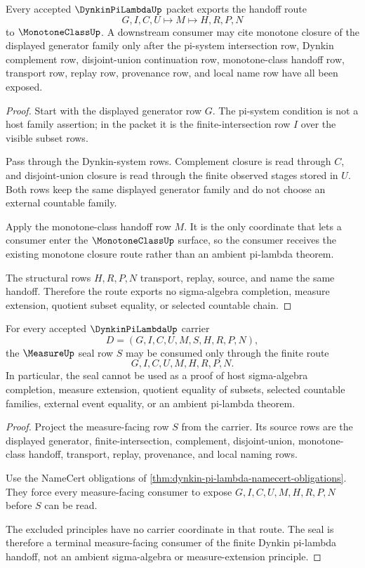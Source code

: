 \begin{theorem}
\label{thm:dynkin-pi-lambda-monotone-class-handoff}
Every accepted $\DynkinPiLambdaUp$ packet exports the handoff route
$$
G,I,C,U \longmapsto M \longmapsto H,R,P,N
$$
to $\MonotoneClassUp$. A downstream consumer may cite monotone closure of the displayed generator family only after the pi-system intersection row, Dynkin complement row, disjoint-union continuation row, monotone-class handoff row, transport row, replay row, provenance row, and local name row have all been exposed.
\end{theorem}
\begin{proof}
Start with the displayed generator row $G$. The pi-system condition is not a host family assertion; in the packet it is the finite-intersection row $I$ over the visible subset rows.

Pass through the Dynkin-system rows. Complement closure is read through $C$, and disjoint-union closure is read through the finite observed stages stored in $U$. Both rows keep the same displayed generator family and do not choose an external countable family.

Apply the monotone-class handoff row $M$. It is the only coordinate that lets a consumer enter the $\MonotoneClassUp$ surface, so the consumer receives the existing monotone closure route rather than an ambient pi-lambda theorem.

The structural rows $H,R,P,N$ transport, replay, source, and name the same handoff. Therefore the route exports no sigma-algebra completion, measure extension, quotient subset equality, or selected countable chain.
\end{proof}

\begin{theorem}
\label{thm:dynkin-pi-lambda-measure-seal-nonescape}
For every accepted $\DynkinPiLambdaUp$ carrier
$$
D=(G,I,C,U,M,S,H,R,P,N),
$$
the $\MeasureUp$ seal row $S$ may be consumed only through the finite route
$$
G,I,C,U,M,H,R,P,N.
$$
In particular, the seal cannot be used as a proof of host sigma-algebra completion, measure extension, quotient equality of subsets, selected countable families, external event equality, or an ambient pi-lambda theorem.
\end{theorem}
\begin{proof}
Project the measure-facing row $S$ from the carrier. Its source rows are the displayed generator, finite-intersection, complement, disjoint-union, monotone-class handoff, transport, replay, provenance, and local naming rows.

Use the NameCert obligations of \autoref{thm:dynkin-pi-lambda-namecert-obligations}. They force every measure-facing consumer to expose $G,I,C,U,M,H,R,P,N$ before $S$ can be read.

The excluded principles have no carrier coordinate in that route. The seal is therefore a terminal measure-facing consumer of the finite Dynkin pi-lambda handoff, not an ambient sigma-algebra or measure-extension principle.
\end{proof}

